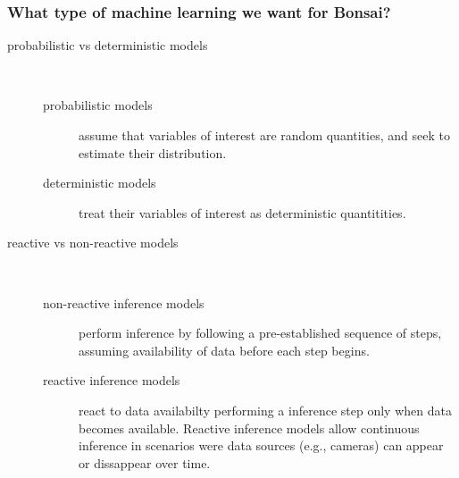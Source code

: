 \begin{frame}
    \frametitle{What type of machine learning we want for Bonsai?}

    \begin{description}

        \item[probabilistic vs deterministic models]\mbox{}\\

            \begin{description}

                \item[probabilistic models] assume that variables of interest are random
      quantities, and seek to estimate their distribution.

                \item[deterministic models]treat their variables of interest as deterministic
      quantitities.

            \end{description}

  \item[reactive vs non-reactive models]\mbox{}\\

            \begin{description}

            \item[non-reactive inference models] perform inference by following a pre-established sequence of steps, assuming availability of data before each step begins.

            \item[reactive inference models] react to data availabilty performing a inference step only when data becomes available. Reactive inference models allow continuous inference in scenarios were data sources (e.g., cameras) can appear or dissappear over time.

            \end{description}

    \end{description}

\end{frame}

